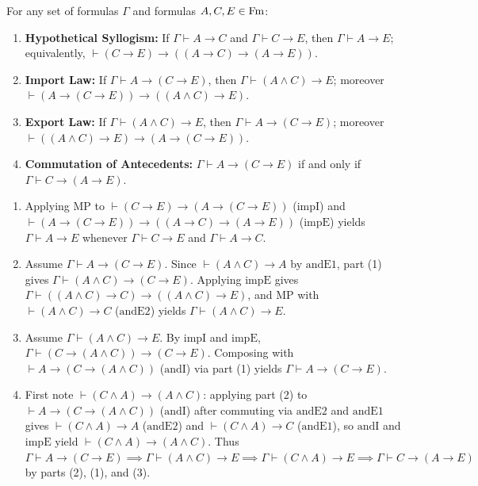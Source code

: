 \documentclass[10pt,a4paper]{article}
\begin{document}
\begin{lemma}\label{lem:import_export}
For any set of formulas $\Gamma$ and formulas $A, C, E \in {\textrm{Fm}}$:
\begin{enumerate}
\item \textbf{Hypothetical Syllogism:} If $\Gamma \vdash A \to C$ and $\Gamma \vdash C \to E$, then $\Gamma \vdash A \to E$; equivalently, $\vdash (C \to E) \to ((A \to C) \to (A \to E))$.
\item \textbf{Import Law:} If $\Gamma \vdash A \to (C \to E)$, then $\Gamma \vdash (A \land C) \to E$; moreover $\vdash (A \to (C \to E)) \to ((A \land C) \to E)$.
\item \textbf{Export Law:} If $\Gamma \vdash (A \land C) \to E$, then $\Gamma \vdash A \to (C \to E)$; moreover $\vdash ((A \land C) \to E) \to (A \to (C \to E))$.
\item \textbf{Commutation of Antecedents:} $\Gamma \vdash A \to (C \to E)$ if and only if $\Gamma \vdash C \to (A \to E)$.
\end{enumerate}
\end{lemma}
\myprf
\begin{enumerate}
\item Applying $\textrm{MP}$ to $\vdash (C \to E) \to (A \to (C \to E))$ ($\textrm{impI}$) and $\vdash (A \to (C \to E)) \to ((A \to C) \to (A \to E))$ ($\textrm{impE}$) yields $\Gamma \vdash A \to E$ whenever $\Gamma \vdash C \to E$ and $\Gamma \vdash A \to C$.
\item Assume $\Gamma \vdash A \to (C \to E)$. Since $\vdash (A \land C) \to A$ by $\textrm{andE1}$, part (1) gives $\Gamma \vdash (A \land C) \to (C \to E)$. Applying $\textrm{impE}$ gives $\Gamma \vdash ((A \land C) \to C) \to ((A \land C) \to E)$, and $\textrm{MP}$ with $\vdash (A \land C) \to C$ ($\textrm{andE2}$) yields $\Gamma \vdash (A \land C) \to E$.
\item Assume $\Gamma \vdash (A \land C) \to E$. By $\textrm{impI}$ and $\textrm{impE}$, $\Gamma \vdash (C \to (A \land C)) \to (C \to E)$. Composing with $\vdash A \to (C \to (A \land C))$ ($\textrm{andI}$) via part (1) yields $\Gamma \vdash A \to (C \to E)$.
\item First note $\vdash (C \land A) \to (A \land C)$: applying part (2) to $\vdash A \to (C \to (A \land C))$ ($\textrm{andI}$) after commuting via $\textrm{andE2}$ and $\textrm{andE1}$ gives $\vdash (C \land A) \to A$ ($\textrm{andE2}$) and $\vdash (C \land A) \to C$ ($\textrm{andE1}$), so $\textrm{andI}$ and $\textrm{impE}$ yield $\vdash (C \land A) \to (A \land C)$. Thus $\Gamma \vdash A \to (C \to E) \implies \Gamma \vdash (A \land C) \to E \implies \Gamma \vdash (C \land A) \to E \implies \Gamma \vdash C \to (A \to E)$ by parts (2), (1), and (3).
\end{enumerate}
\myqed
\end{document}
